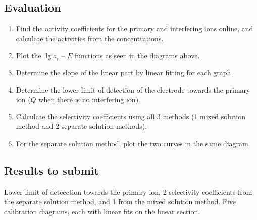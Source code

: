 \subsection{Evaluation}
\begin{enumerate}
\item Find the activity coefficients for the primary and interfering ions online, and calculate the activities from the concentrations.

\item Plot the $\lg a_i$ -- $E$ functions as seen in the diagrams above. 

\item Determine the slope of the linear part by linear fitting for each graph.

\item Determine the lower limit of detection of the electrode towards the primary ion ($Q$ when there is no interfering ion).

\item Calculate the selectivity coefficients using all 3 methods (1 mixed solution method and 2 separate solution methods).

\item For the separate solution method, plot the two curves in the same diagram.
\end{enumerate}

\subsection{Results to submit}
Lower limit of detecction towards the primary ion, 2 selectivity coefficients from the separate solution method, and 1 from the mixed solution method.
Five calibration diagrams, each with linear fits on the linear section.

\vfill
